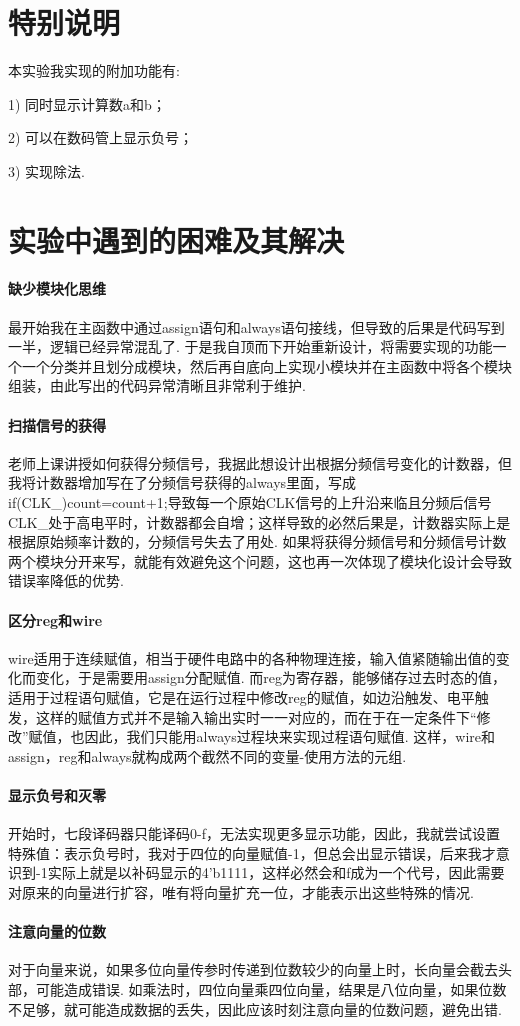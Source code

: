 \documentclass[UTF8]{ctexart}
\begin{document}
\section{特别说明}
本实验我实现的附加功能有:\par
1) 同时显示计算数a和b；\par
2) 可以在数码管上显示负号；\par
3) 实现除法.

\section{实验中遇到的困难及其解决}
\paragraph{缺少模块化思维}最开始我在主函数中通过assign语句和always语句接线，但导致的后果是代码写到一半，逻辑已经异常混乱了. 于是我自顶而下开始重新设计，将需要实现的功能一个一个分类并且划分成模块，然后再自底向上实现小模块并在主函数中将各个模块组装，由此写出的代码异常清晰且非常利于维护.
\paragraph{扫描信号的获得}老师上课讲授如何获得分频信号，我据此想设计出根据分频信号变化的计数器，但我将计数器增加写在了分频信号获得的always里面，写成if(CLK\_)count=count+1;导致每一个原始CLK信号的上升沿来临且分频后信号CLK\_处于高电平时，计数器都会自增；这样导致的必然后果是，计数器实际上是根据原始频率计数的，分频信号失去了用处. 如果将获得分频信号和分频信号计数两个模块分开来写，就能有效避免这个问题，这也再一次体现了模块化设计会导致错误率降低的优势.
\paragraph{区分reg和wire}wire适用于连续赋值，相当于硬件电路中的各种物理连接，输入值紧随输出值的变化而变化，于是需要用assign分配赋值. 而reg为寄存器，能够储存过去时态的值，适用于过程语句赋值，它是在运行过程中修改reg的赋值，如边沿触发、电平触发，这样的赋值方式并不是输入输出实时一一对应的，而在于在一定条件下“修改”赋值，也因此，我们只能用always过程块来实现过程语句赋值. 这样，wire和assign，reg和always就构成两个截然不同的变量-使用方法的元组.
\paragraph{显示负号和灭零}开始时，七段译码器只能译码0-f，无法实现更多显示功能，因此，我就尝试设置特殊值：表示负号时，我对于四位的向量赋值-1，但总会出显示错误，后来我才意识到-1实际上就是以补码显示的4'b1111，这样必然会和f成为一个代号，因此需要对原来的向量进行扩容，唯有将向量扩充一位，才能表示出这些特殊的情况.

\paragraph{注意向量的位数}对于向量来说，如果多位向量传参时传递到位数较少的向量上时，长向量会截去头部，可能造成错误. 如乘法时，四位向量乘四位向量，结果是八位向量，如果位数不足够，就可能造成数据的丢失，因此应该时刻注意向量的位数问题，避免出错.
\end{document}
